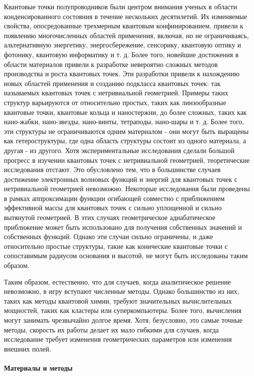 \documentclass[a4paper,14pt]{extarticle}
\begin{document}
Квантовые точки полупроводников были центром внимания ученых в области конденсированного состояния в течение нескольких десятилетий. Их изменяемые свойства, опосредованные трехмерным квантовым конфинированием, привели к появлению многочисленных областей применения, включая, но не ограничиваясь, альтернативную энергетику, энергосбережение, сенсорику, квантовую оптику и фотонику, квантовую информатику и т. д. Более того, новейшие достижения в области материалов привели к разработке невероятно сложных методов производства и роста квантовых точек. Эти разработки привели к нахождению новых областей применения и созданию подкласса квантовых точек: так называемых квантовых точек с нетривиальной геометрией. Примеры таких структур варьируются от относительно простых, таких как линзообразные квантовые точки, квантовые кольца и наностержни, до более сложных, таких как нано-жабки, нано-звезды, нано-винты, тетраподы, нано-шары и т. д. Более того, эти структуры не ограничиваются одним материалом - они могут быть выращены как гетероструктуры, где одна область структуры состоит из одного материала, а другая - из другого. Хотя экспериментальные исследования сделали большой прогресс в изучении квантовых точек с нетривиальной геометрией, теоретические исследования отстают. Это обусловлено тем, что в большинстве случаев достижение электронных волновых функций и энергий для квантовых точек с нетривиальной геометрией невозможно. Некоторые исследования были проведены в рамках аппроксимации функции огибающей совместно с приближением эффективной массы для квантовых точек с сильно уплощенной и сильно вытянутой геометрией. В этих случаях геометрическое адиабатическое приближение может быть использовано для получения собственных значений и собственных функций. Однако эти случаи сильно ограничены, и даже относительно простые структуры, такие как конические квантовые точки с сопоставимым радиусом основания и высотой, не могут быть исследованы таким образом.

Таким образом, естественно, что для случаев, когда аналитическое решение невозможно, в игру вступают численные методы. Однако большинство из них, таких как методы квантовой химии, требуют значительных вычислительных мощностей, таких как кластеры или суперкомпьютеры. Более того, вычисления могут занимать чрезвычайно долгое время. Хотя, безусловно, это самые точные методы, скорость их работы делает их мало гибкими для случаев, когда исследование требует изменения геометрических параметров или изменения внешних полей.\cite{mantashyan}

\paragraph{Материалы и методы}
\end{document}
